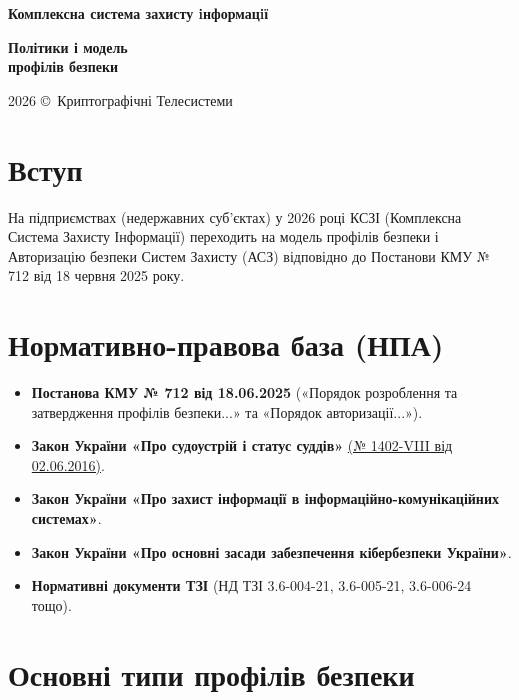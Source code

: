 \documentclass{article}
\newcommand\HUGE[1]{\fontsize{40}{40}\selectfont #1}
\begin{document}
\pagestyle{fancy}

\begin{titlepage}
  \AddToShipoutPictureBG*{\AtPageLowerLeft{\color{nato}\rule{\paperwidth}{\paperheight}}}
  \color{white}\thispagestyle{empty}\vspace*{4cm}\centering
  {\Huge  \textbf{Комплексна система захисту iнформацiї} \par} \vspace{2cm}
  {\HUGE  \textbf{Політики і модель \\ профілів безпеки} \par} \vspace{2.5cm}
  \vfill
  {\large 2026 \copyright\ Криптографічні Телесистеми \par}
\end{titlepage}

\newpage

\tableofcontents

\section{Вступ}
На підприємствах (недержавних суб’єктах) у 2026 році КСЗІ (Комплексна Система Захисту Інформації) переходить
на модель профілів безпеки і Авторизацію безпеки Систем Захисту (АСЗ) відповідно до Постанови
КМУ № 712 від 18 червня 2025 року.

\section{Нормативно-правова база (НПА)}

\begin{itemize}
    \item \textbf{Постанова КМУ № 712 від 18.06.2025} («Порядок розроблення та затвердження профілів безпеки...» та «Порядок авторизації...»).
    \item \textbf{Закон України «Про судоустрій і статус суддів»} \href{https://zakon.rada.gov.ua/laws/show/1402-19}{(№ 1402-VIII від 02.06.2016)}.
    \item \textbf{Закон України «Про захист інформації в інформаційно-комунікаційних системах»}.
    \item \textbf{Закон України «Про основні засади забезпечення кібербезпеки України»}.
    \item \textbf{Нормативні документи ТЗІ} (НД ТЗІ 3.6-004-21, 3.6-005-21, 3.6-006-24 тощо).
\end{itemize}

\section{Основні типи профілів безпеки}
\end{document}
